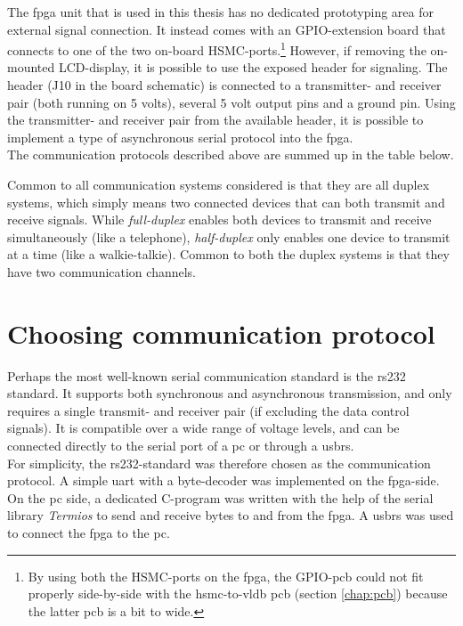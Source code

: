 \documentclass[main.tex]{subfiles}
\begin{document}
The \gls{fpga} unit that is used in this thesis has no dedicated prototyping area for external signal connection. It instead comes with an GPIO-extension board that connects to one of the two on-board HSMC-ports.\footnote{By using both the HSMC-ports on the \gls{fpga}, the GPIO-\gls{pcb} could not fit properly side-by-side with the \acrshort{hsmc}-to-\acrshort{vldb} \acrshort{pcb} (section \ref{chap:pcb}) because the latter \gls{pcb} is a bit to wide.} However, if removing the on-mounted LCD-display, it is possible to use the exposed header for signaling. The header (J10 in the board schematic) is connected to a transmitter- and receiver pair (both running on 5 volts), several 5 volt output pins and a ground pin. Using the transmitter- and receiver pair from the available header, it is possible to implement a type of asynchronous serial protocol into the \gls{fpga}.\\

The communication protocols described above are summed up in the table below.

Common to all communication systems considered is that they are all duplex systems, which simply means two connected devices that can both transmit and receive signals. While \textit{full-duplex} enables both devices to transmit and receive simultaneously (like a telephone), \textit{half-duplex} only enables one device to transmit at a time (like a walkie-talkie). Common to both the duplex systems is that they have two communication channels. 

\section{Choosing communication protocol}
Perhaps the most well-known serial communication standard is the \gls{rs232} standard. It supports both synchronous and asynchronous transmission, and only requires a single transmit- and receiver pair (if excluding the data control signals). It is compatible over a wide range of voltage levels, and can be connected directly to the serial port of a \gls{pc} or through a \gls{usbrs}. \\

For simplicity, the \acrshort{rs232}-standard was therefore chosen as the communication protocol. A simple \gls{uart} with a byte-decoder was implemented on the \gls{fpga}-side. On the \gls{pc} side, a dedicated C-program was written with the help of the serial library \textit{Termios} to send and receive bytes to and from the \gls{fpga}.  A \gls{usbrs} was used to connect the \gls{fpga} to the \gls{pc}. 
\end{document}

